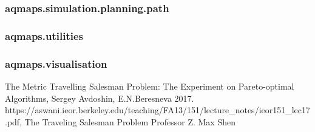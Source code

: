\documentclass[10pt,a4paper]{article}
\begin{document}
\subsubsection{aqmaps.simulation.planning.path}
\label{sec:aqmaps.simulation.planning.path}

\subsubsection{aqmaps.utilities}
\label{sec:aqmaps.utilities}

\subsubsection{aqmaps.visualisation}
\label{sec:aqmaps.visualisation}

\normalsize
\begin{thebibliography}{9}

The Metric Travelling Salesman Problem:
The Experiment on Pareto-optimal
Algorithms,
Sergey Avdoshin, E.N.Beresneva
2017.
https://aswani.ieor.berkeley.edu/teaching/FA13/151/lecture\_notes/ieor151\_lec17.pdf,
The Traveling Salesman Problem
Professor Z. Max Shen

\end{thebibliography}
\end{document}
